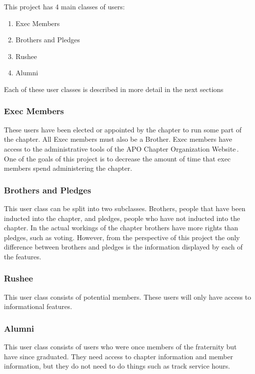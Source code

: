 \documentclass{article}
\newcommand{\projName}{APO Chapter Organization Website}
\begin{document}
This project has 4 main classes of users:

\begin{enumerate}
  \item Exec Members
  \item Brothers and Pledges
  \item Rushee
    \item Alumni
\end{enumerate}

Each of these user classes is described in more detail in the next sections

\subsubsection{Exec Members}

These users have been elected or appointed by the chapter to run some
part of the chapter. All Exec members must also be a Brother. Exec
members have access to the administrative tools of the \projName \,. One
of the goals of this project is to decrease the amount of time that
exec members spend administering the chapter.

\subsubsection{Brothers and Pledges}

This user class can be split into two subclasses. Brothers, people that have been
inducted into the chapter, and pledges, people who have not inducted
into the chapter. In the actual
workings of the chapter brothers have more rights than pledges, such
as voting. However, from the perspective of this project the only
difference between brothers and pledges is the information displayed
by each of the features.

\subsubsection{Rushee}

This user class consists of potential members. These users will only
have access to informational features.

\subsubsection{Alumni}

This user class consists of users who were once members of the
fraternity but have since graduated. They need access to chapter
information and member information, but they do not need to do things
such as track service hours.
\end{document}
